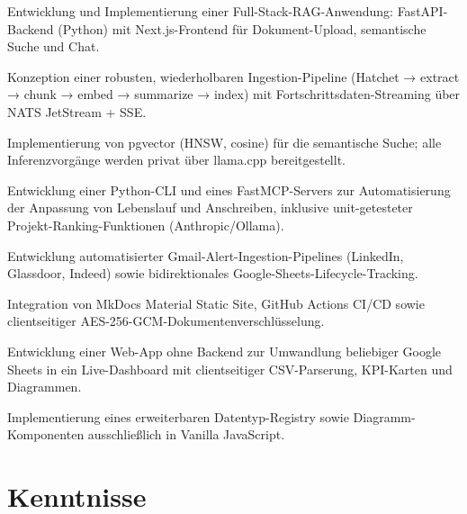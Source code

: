 \documentclass[10pt,a4paper]{resume}
\begin{document}
\bullets
  \item Entwicklung und Implementierung einer Full-Stack-RAG-Anwendung: FastAPI-Backend (Python) mit Next.js-Frontend für Dokument-Upload, semantische Suche und Chat.
  \item Konzeption einer robusten, wiederholbaren Ingestion-Pipeline (Hatchet → extract → chunk → embed → summarize → index) mit Fortschrittsdaten-Streaming über NATS JetStream + SSE.
  \item Implementierung von pgvector (HNSW, cosine) für die semantische Suche; alle Inferenzvorgänge werden privat über llama.cpp bereitgestellt.
\bulletsend
\vspace{1.0pt}
\bullets
  \item Entwicklung einer Python-CLI und eines FastMCP-Servers zur Automatisierung der Anpassung von Lebenslauf und Anschreiben, inklusive unit-getesteter Projekt-Ranking-Funktionen (Anthropic/Ollama).
  \item Entwicklung automatisierter Gmail-Alert-Ingestion-Pipelines (LinkedIn, Glassdoor, Indeed) sowie bidirektionales Google-Sheets-Lifecycle-Tracking.
  \item Integration von MkDocs Material Static Site, GitHub Actions CI/CD sowie clientseitiger AES-256-GCM-Dokumentenverschlüsselung.
\bulletsend
\vspace{1.0pt}
\bullets
  \item Entwicklung einer Web-App ohne Backend zur Umwandlung beliebiger Google Sheets in ein Live-Dashboard mit clientseitiger CSV-Parserung, KPI-Karten und Diagrammen.
  \item Implementierung eines erweiterbaren Datentyp-Registry sowie Diagramm-Komponenten ausschließlich in Vanilla JavaScript.
\bulletsend

\section{Kenntnisse}
\end{document}

